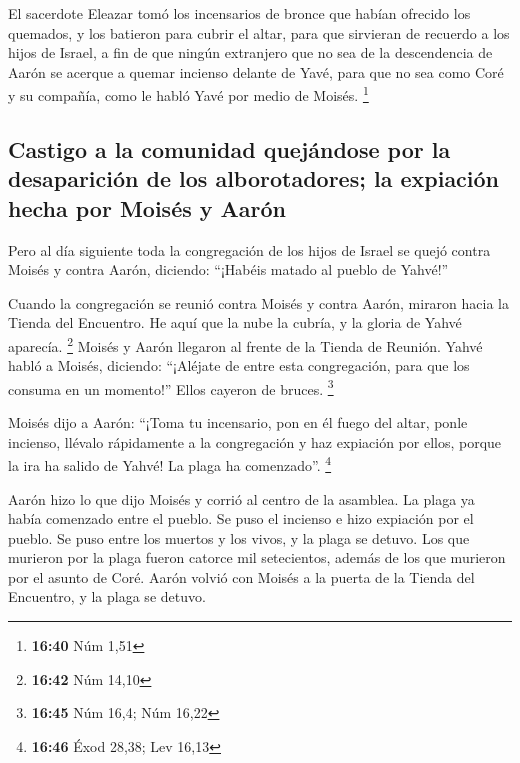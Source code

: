  El sacerdote Eleazar tomó los incensarios de bronce que
habían ofrecido los quemados, y los batieron para cubrir el altar,
 para que sirvieran de recuerdo a los hijos de Israel, a
fin de que ningún extranjero que no sea de la descendencia de Aarón se
acerque a quemar incienso delante de Yavé, para que no sea como Coré y
su compañía, como le habló Yavé por medio de Moisés. \footnote{\textbf{16:40}
  Núm 1,51}

\hypertarget{castigo-a-la-comunidad-quejuxe1ndose-por-la-desapariciuxf3n-de-los-alborotadores-la-expiaciuxf3n-hecha-por-moisuxe9s-y-aaruxf3n}{%
\subsection{Castigo a la comunidad quejándose por la desaparición de los
alborotadores; la expiación hecha por Moisés y
Aarón}\label{castigo-a-la-comunidad-quejuxe1ndose-por-la-desapariciuxf3n-de-los-alborotadores-la-expiaciuxf3n-hecha-por-moisuxe9s-y-aaruxf3n}}

 Pero al día siguiente toda la congregación de los hijos
de Israel se quejó contra Moisés y contra Aarón, diciendo: ``¡Habéis
matado al pueblo de Yahvé!''

 Cuando la congregación se reunió contra Moisés y contra
Aarón, miraron hacia la Tienda del Encuentro. He aquí que la nube la
cubría, y la gloria de Yahvé aparecía. \footnote{\textbf{16:42} Núm
  14,10}  Moisés y Aarón llegaron al frente de la Tienda
de Reunión.  Yahvé habló a Moisés, diciendo:
 ``¡Aléjate de entre esta congregación, para que los
consuma en un momento!'' Ellos cayeron de bruces. \footnote{\textbf{16:45}
  Núm 16,4; Núm 16,22}

 Moisés dijo a Aarón: ``¡Toma tu incensario, pon en él
fuego del altar, ponle incienso, llévalo rápidamente a la congregación y
haz expiación por ellos, porque la ira ha salido de Yahvé! La plaga ha
comenzado''. \footnote{\textbf{16:46} Éxod 28,38; Lev 16,13}

 Aarón hizo lo que dijo Moisés y corrió al centro de la
asamblea. La plaga ya había comenzado entre el pueblo. Se puso el
incienso e hizo expiación por el pueblo.  Se puso entre
los muertos y los vivos, y la plaga se detuvo.  Los que
murieron por la plaga fueron catorce mil setecientos, además de los que
murieron por el asunto de Coré.  Aarón volvió con Moisés
a la puerta de la Tienda del Encuentro, y la plaga se detuvo.

